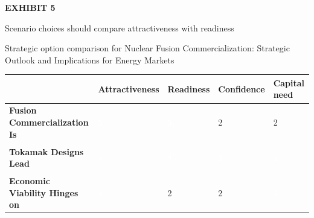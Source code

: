 \documentclass[10pt,a4paper]{article}
\begin{document}
\clearpage
{\textcolor{BOGreen}{\scriptsize\bfseries EXHIBIT 5}}\par\vspace{4pt}
{\sffamily\fontsize{17}{21}\selectfont\color{BONavy} Scenario choices should compare attractiveness with readiness}\par
{\small\color{BOText} Strategic option comparison for Nuclear Fusion Commercialization: Strategic Outlook and Implications for Energy Markets}\par\vspace{6pt}
{\scriptsize\begin{tabular}{p{38mm}>{\centering\arraybackslash}p{21mm}>{\centering\arraybackslash}p{21mm}>{\centering\arraybackslash}p{21mm}>{\centering\arraybackslash}p{21mm}}
 & {\bfseries Attractiveness} & {\bfseries Readiness} & {\bfseries Confidence} & {\bfseries Capital need} \\
\hline
{\bfseries Fusion Commercialization Is} & \colorbox{BOGreen}{\textcolor{white}{\strut\hspace{5pt}5\hspace{5pt}}} & \colorbox{BOBlue}{\textcolor{white}{\strut\hspace{5pt}3\hspace{5pt}}} & \colorbox{BOLight}{\textcolor{BOText}{\strut\hspace{5pt}2\hspace{5pt}}} & \colorbox{BOLight}{\textcolor{BOText}{\strut\hspace{5pt}2\hspace{5pt}}} \\
{\bfseries Tokamak Designs Lead} & \colorbox{BOGreen}{\textcolor{white}{\strut\hspace{5pt}4\hspace{5pt}}} & \colorbox{BOGreen}{\textcolor{white}{\strut\hspace{5pt}4\hspace{5pt}}} & \colorbox{BOBlue}{\textcolor{white}{\strut\hspace{5pt}3\hspace{5pt}}} & \colorbox{BOBlue}{\textcolor{white}{\strut\hspace{5pt}3\hspace{5pt}}} \\
{\bfseries Economic Viability Hinges on} & \colorbox{BOGreen}{\textcolor{white}{\strut\hspace{5pt}4\hspace{5pt}}} & \colorbox{BOLight}{\textcolor{BOText}{\strut\hspace{5pt}2\hspace{5pt}}} & \colorbox{BOLight}{\textcolor{BOText}{\strut\hspace{5pt}2\hspace{5pt}}} & \colorbox{BOGreen}{\textcolor{white}{\strut\hspace{5pt}4\hspace{5pt}}} \\

\end{tabular}}
\end{document}

